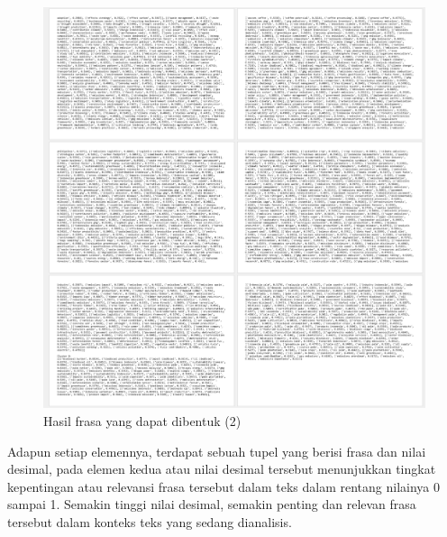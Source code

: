 \begin{figure}[H]
    \centering
    \includegraphics[width=\linewidth]{img/L2-2.png}
    \caption{Hasil frasa yang dapat dibentuk (2)}
    \label{fig:L2-2}
\end{figure}

Adapun setiap elemennya, terdapat sebuah tupel yang berisi frasa dan nilai desimal, pada elemen kedua atau nilai desimal tersebut menunjukkan tingkat kepentingan atau relevansi frasa tersebut dalam teks dalam rentang nilainya 0 sampai 1. Semakin tinggi nilai desimal, semakin penting dan relevan frasa tersebut dalam konteks teks yang sedang dianalisis.